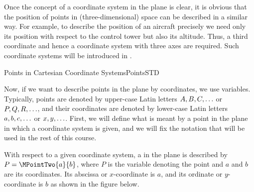\begin{MIntro}
Once the concept of a coordinate system in the plane is clear, it is obvious that the position of points
in (three-dimensional) space can be described in a similar way. For example, to describe the position of an aircraft precisely we need only its position with respect to the control tower but also its altitude. 
Thus, a third coordinate and hence a coordinate system with three axes are required. Such coordinate systems 
will be introduced in .
\end{MIntro}

\begin{MXContent}{Points in Cartesian Coordinate Systems}{Points}{STD}

Now, if we want to describe points in the plane by coordinates, we use variables. 
Typically, points are denoted by upper-case Latin letters $A,B,C,\hdots$ or $P,Q,R,\hdots$, and their coordinates 
are denoted by lower-case Latin letters $a,b,c,\hdots$ or $x,y,\hdots$. First, we will define what is 
meant by a point in the plane in which a coordinate system is given, and we will fix the notation that will be used 
in the rest of this course.

\begin{MInfo}

With respect to a given coordinate system, a  in the plane is described by $P=\MPointTwo{a}{b}$,
where $P$ is the variable denoting the point and $a$ and $b$ are its coordinates. Its abscissa or $x$-coordinate is 
$a$, and its ordinate or $y$-coordinate is $b$ as shown in the figure below.

\begin{center}
\end{center}
\end{MInfo}
\end{MXContent}
